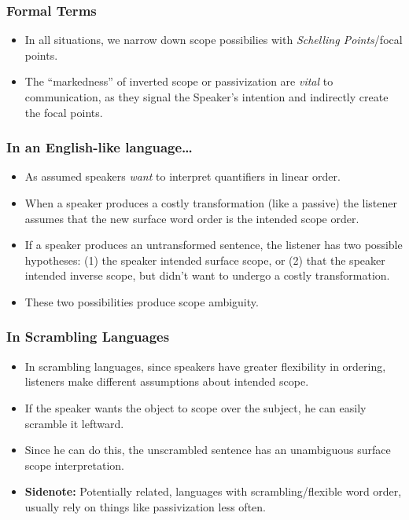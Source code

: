 \documentclass{beamer}
\begin{document}
	\begin{frame}
		\frametitle{Formal Terms}\pause

		\begin{itemize}
			\item In all situations, we narrow down scope possibilies with \emph{Schelling Points}/focal points.\pause
			\item The ``markedness'' of inverted scope or passivization are \emph{vital} to communication, as they signal the Speaker's intention and indirectly create the focal points.
		\end{itemize}

	\end{frame}

\begin{frame}
\frametitle{In an English-like language\ldots}\pause
\begin{itemize}
\item As assumed speakers \emph{want} to interpret quantifiers in linear order.\pause
\item When a speaker produces a costly transformation (like a passive) the listener assumes that the new surface word order is the intended scope order.\pause
\item If a speaker produces an untransformed sentence, the listener has two possible hypotheses: (1) the speaker intended surface scope, or (2) that the speaker intended inverse scope, but didn't want to undergo a costly transformation.\pause
\item These two possibilities produce scope ambiguity.
\end{itemize}
\end{frame}


\begin{frame}
\frametitle{In Scrambling Languages}\pause
\begin{itemize}
\item In scrambling languages, since speakers have greater flexibility in ordering, listeners make different assumptions about intended scope.\pause
\item If the speaker wants the object to scope over the subject, he can easily scramble it leftward.\pause
\item Since he can do this, the unscrambled sentence has an unambiguous surface scope interpretation.\pause
\item \textbf{Sidenote:} Potentially related, languages with scrambling/flexible word order, usually rely on things like passivization less often.
\end{itemize}
\end{frame}
\end{document}
